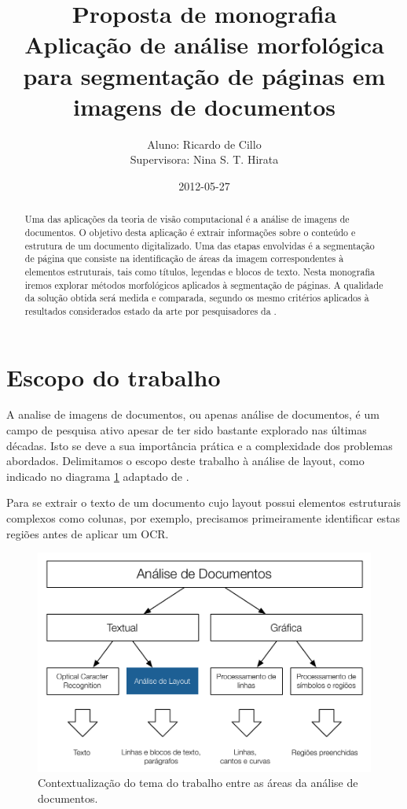 \documentclass[a4paper,11pt]{article}
\title{Proposta de monografia \\ Aplicação de análise morfológica para segmentação de páginas em imagens de documentos}
\author{ Aluno: Ricardo de Cillo \\ Supervisora: Nina S. T. Hirata }
\date{2012-05-27}
\begin{document}
\maketitle


\begin{abstract}
	Uma das aplicações da teoria de visão computacional é a análise de imagens de documentos. O objetivo desta aplicação é extrair informações sobre o conteúdo e estrutura de um documento digitalizado. Uma das etapas envolvidas é a segmentação de página que consiste na identificação de áreas da imagem correspondentes à elementos estruturais, tais como títulos, legendas e blocos de texto. Nesta monografia iremos explorar métodos morfológicos aplicados à segmentação de páginas. A qualidade da solução obtida será medida e comparada, segundo os mesmo critérios aplicados à resultados considerados estado da arte por pesquisadores da .
\end{abstract}

\section{Escopo do trabalho}

A analise de imagens de documentos, ou apenas análise de documentos, é um campo de pesquisa ativo apesar de ter sido bastante explorado nas últimas décadas. Isto se deve a sua importância prática e a complexidade dos problemas abordados. Delimitamos o escopo deste trabalho à análise de layout, como indicado no diagrama \ref{fig:context1} adaptado de \cite{Kasturi_OGorman_Govindaraju_2002}.

Para se extrair o texto de um documento cujo layout possui elementos estruturais complexos como colunas, por exemplo, precisamos primeiramente identificar estas regiões antes de aplicar um OCR.

\begin{figure}[htb!]
\begin{center}
\includegraphics{assets/document_processing_areas_hierarquies.pdf}
\end{center}
\caption{Contextualização do tema do trabalho entre as áreas da análise de documentos.}
\label{fig:context1}
\end{figure}
\end{document}
